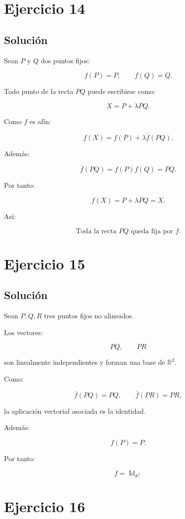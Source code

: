 \documentclass[11pt,a4paper]{article}
\newcommand{\R}{\mathbb{R}}
\begin{document}
\section{Ejercicio 14}
\subsection{Solución}

Sean \(P\) y \(Q\) dos puntos fijos:

\[
f(P)=P,
\qquad
f(Q)=Q.
\]

Todo punto de la recta \(PQ\) puede escribirse como:

\[
X=P+\lambda PQ.
\]

Como \(f\) es afín:

\[
f(X)
=
f(P)+\lambda\bar f(PQ).
\]

Además:

\[
\bar f(PQ)
=
f(P)f(Q)
=
PQ.
\]

Por tanto:

\[
f(X)
=
P+\lambda PQ
=
X.
\]

Así:

\[
\boxed{
\text{Toda la recta }PQ\text{ queda fija por }f.
}
\]

\section{Ejercicio 15}
\subsection{Solución}

Sean \(P,Q,R\) tres puntos fijos no alineados.

Los vectores:

\[
PQ,\qquad PR
\]

son linealmente independientes y forman una base de \(\R^2\).

Como:

\[
\bar f(PQ)=PQ,
\qquad
\bar f(PR)=PR,
\]

la aplicación vectorial asociada es la identidad.

Además:

\[
f(P)=P.
\]

Por tanto:

\[
\boxed{
f=\operatorname{Id}_{\mathbb A^2}
}
\]

\section{Ejercicio 16}
\end{document}
